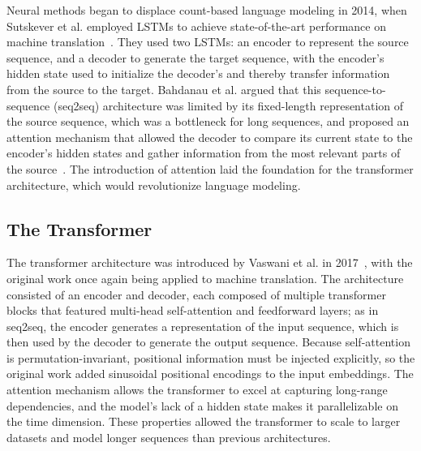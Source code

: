Neural methods began to displace count-based language modeling in 2014, when Sutskever et al. employed LSTMs to achieve state-of-the-art performance on machine translation~\cite{sutskever2014sequence}. They used two LSTMs: an encoder to represent the source sequence, and a decoder to generate the target sequence, with the encoder's hidden state used to initialize the decoder's and thereby transfer information from the source to the target. Bahdanau et al. argued that this sequence-to-sequence (seq2seq) architecture was limited by its fixed-length representation of the source sequence, which was a bottleneck for long sequences, and proposed an attention mechanism that allowed the decoder to compare its current state to the encoder's hidden states and gather information from the most relevant parts of the source~\cite{bahdanau2014neural}. The introduction of attention laid the foundation for the transformer architecture, which would revolutionize language modeling.

\subsection{The Transformer}\label{sec:ch1-transformer}
The transformer architecture was introduced by Vaswani et al. in 2017~\cite{attention}, with the original work once again being applied to machine translation. The architecture consisted of an encoder and decoder, each composed of multiple transformer blocks that featured multi-head self-attention and feedforward layers; as in seq2seq, the encoder generates a representation of the input sequence, which is then used by the decoder to generate the output sequence. Because self-attention is permutation-invariant, positional information must be injected explicitly, so the original work added sinusoidal positional encodings to the input embeddings. The attention mechanism allows the transformer to excel at capturing long-range dependencies, and the model's lack of a hidden state makes it parallelizable on the time dimension. These properties allowed the transformer to scale to larger datasets and model longer sequences than previous architectures.

